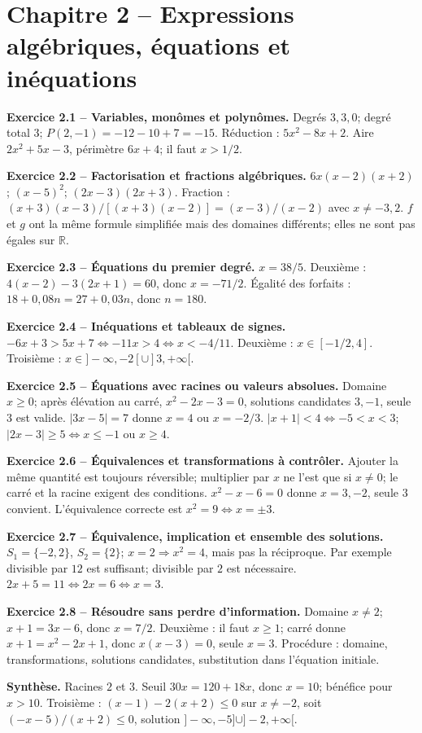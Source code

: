 \documentclass[11pt,a4paper,openany]{book}
\newcommand{\R}{\mathbb{R}}\newcommand{\N}{\mathbb{N}}\newcommand{\Z}{\mathbb{Z}}\newcommand{\Q}{\mathbb{Q}}
\begin{document}
\chapter*{Chapitre 2 -- Expressions algébriques, équations et inéquations}
\begin{answerbox}
\textbf{Exercice 2.1 -- Variables, monômes et polynômes.} Degrés $3,3,0$; degré total $3$; $P(2,-1)=-12-10+7=-15$. Réduction : $5x^2-8x+2$. Aire $2x^2+5x-3$, périmètre $6x+4$; il faut $x>1/2$.\par
\textbf{Exercice 2.2 -- Factorisation et fractions algébriques.} $6x(x-2)(x+2)$; $(x-5)^2$; $(2x-3)(2x+3)$. Fraction : $(x+3)(x-3)/[(x+3)(x-2)]=(x-3)/(x-2)$ avec $x\neq-3,2$. $f$ et $g$ ont la même formule simplifiée mais des domaines différents; elles ne sont pas égales sur $\R$.\par
\textbf{Exercice 2.3 -- Équations du premier degré.} $x=38/5$. Deuxième : $4(x-2)-3(2x+1)=60$, donc $x=-71/2$. Égalité des forfaits : $18+0{,}08n=27+0{,}03n$, donc $n=180$.\par
\textbf{Exercice 2.4 -- Inéquations et tableaux de signes.} $-6x+3>5x+7\iff-11x>4\iff x<-4/11$. Deuxième : $x\in[-1/2,4]$. Troisième : $x\in]-\infty,-2[\cup]3,+\infty[$.\par
\textbf{Exercice 2.5 -- Équations avec racines ou valeurs absolues.} Domaine $x\ge0$; après élévation au carré, $x^2-2x-3=0$, solutions candidates $3,-1$, seule $3$ est valide. $|3x-5|=7$ donne $x=4$ ou $x=-2/3$. $|x+1|<4\iff-5<x<3$; $|2x-3|\ge5\iff x\le-1$ ou $x\ge4$.\par
\textbf{Exercice 2.6 -- Équivalences et transformations à contrôler.} Ajouter la même quantité est toujours réversible; multiplier par $x$ ne l'est que si $x\neq0$; le carré et la racine exigent des conditions. $x^2-x-6=0$ donne $x=3,-2$, seule $3$ convient. L'équivalence correcte est $x^2=9\iff x=\pm3$.\par
\textbf{Exercice 2.7 -- Équivalence, implication et ensemble des solutions.} $S_1=\{-2,2\}$, $S_2=\{2\}$; $x=2\Rightarrow x^2=4$, mais pas la réciproque. Par exemple divisible par $12$ est suffisant; divisible par $2$ est nécessaire. $2x+5=11\iff2x=6\iff x=3$.\par
\textbf{Exercice 2.8 -- Résoudre sans perdre d'information.} Domaine $x\neq2$; $x+1=3x-6$, donc $x=7/2$. Deuxième : il faut $x\ge1$; carré donne $x+1=x^2-2x+1$, donc $x(x-3)=0$, seule $x=3$. Procédure : domaine, transformations, solutions candidates, substitution dans l'équation initiale.\par
\medskip\textbf{Synthèse.} Racines $2$ et $3$. Seuil $30x=120+18x$, donc $x=10$; bénéfice pour $x>10$. Troisième : $(x-1)-2(x+2)\le0$ sur $x\neq-2$, soit $(-x-5)/(x+2)\le0$, solution $]-\infty,-5]\cup]-2,+\infty[$.
\end{answerbox}
\end{document}
